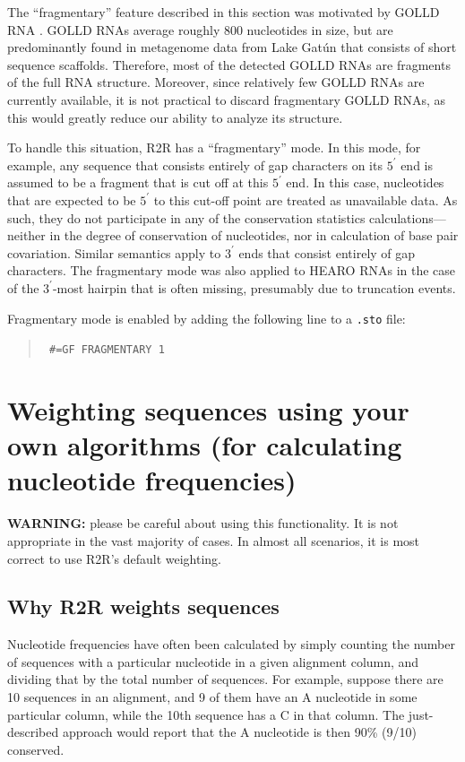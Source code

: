 \documentclass[letterpaper,12pt]{report}
\newcommand{\example}[1]{
\begin{quote}
{\raggedright
#1
}
\end{quote}
}
\newcommand{\examplett}[1]{
\example{{\tt #1}}
}
\begin{document}
The ``fragmentary'' feature described in this section was motivated by GOLLD RNA \cite{CoolRNAs}.
GOLLD RNAs average roughly 800 nucleotides in size, but are predominantly found in metagenome data
from Lake Gat{\'u}n that consists of short sequence scaffolds.
Therefore, most of the detected GOLLD RNAs are fragments of the full RNA structure.
Moreover, since relatively few GOLLD RNAs are currently available, it is not practical to discard fragmentary
GOLLD RNAs, as this would greatly reduce our ability to analyze its structure.

To handle this situation, R2R has a ``fragmentary'' mode.
In this mode, for example, any sequence that consists entirely of gap characters on its $5^\prime$ end is assumed
to be a fragment that is cut off at this $5^\prime$ end.  In this case, nucleotides that are expected to 
be $5^\prime$ to this cut-off point are treated as unavailable data.  As such, they do not participate
in any of the conservation statistics calculations---neither in the degree of conservation of nucleotides, nor in calculation of base pair covariation.
Similar semantics apply to $3^\prime$ ends that consist entirely of gap characters.
The fragmentary mode was also applied to HEARO RNAs \cite{CoolRNAs} in the case of the $3^\prime$-most hairpin
that is often missing, presumably due to truncation events.

Fragmentary mode is enabled by adding the following line to a {\tt .sto} file:
\examplett{
\#=GF FRAGMENTARY 1
}

\section{Weighting sequences using your own algorithms (for calculating nucleotide frequencies)}
\label{manualweighting}

{\bf WARNING:} please be careful about using this functionality.  It is not appropriate in the vast majority of cases.  In almost all scenarios, it is most correct to use R2R's default weighting.

\subsection{Why R2R weights sequences}
\label{whyweights}

Nucleotide frequencies have often been calculated by simply counting the number of sequences with a particular nucleotide in a given alignment column, and dividing that by the total number of sequences.  For example, suppose there are 10 sequences in an alignment, and 9 of them have an A nucleotide in some particular column, while the 10th sequence has a C in that column.  The just-described approach would report that the A nucleotide is then 90\% (9/10) conserved.
\end{document}

